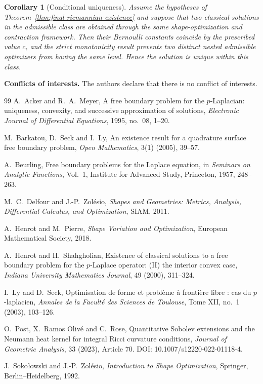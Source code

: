 \documentclass[11pt,a4paper]{article}
\newtheorem{corollary}[theorem]{Corollary}
\theoremstyle{definition}
\theoremstyle{remark}
\begin{document}
\begin{corollary}[Conditional uniqueness]
\label{cor:conditional-uniqueness-riemannian}
Assume the hypotheses of Theorem~\ref{thm:final-riemannian-existence} and
suppose that two classical solutions in the admissible class are obtained
through the same shape-optimization and contraction framework. Then their
Bernoulli constants coincide by the prescribed value $c$, and the strict
monotonicity result prevents two distinct nested admissible optimizers from
having the same level. Hence the solution is unique within this class.
\end{corollary}
\textbf{Conflicts of interests.} The authors declare that there is no conflict of interests.
\begin{thebibliography}{99}
A.~Acker and R.~A.~Meyer,
\newblock A free boundary problem for the $p$-Laplacian:
uniqueness, convexity, and successive approximation of solutions,
\newblock \emph{Electronic Journal of Differential Equations},
1995, no.~08, 1--20.

M.~Barkatou, D.~Seck and I.~Ly,
\newblock An existence result for a quadrature surface free boundary
problem,
\newblock \emph{Open Mathematics}, 3(1) (2005), 39--57.

A.~Beurling,
\newblock Free boundary problems for the Laplace equation,
\newblock in \emph{Seminars on Analytic Functions}, Vol.~1,
Institute for Advanced Study, Princeton, 1957, 248--263.


M.~C.~Delfour and J.-P.~Zol\'esio,
\newblock \emph{Shapes and Geometries: Metrics, Analysis,
Differential Calculus, and Optimization},
\newblock SIAM, 2011.

A.~Henrot and M.~Pierre,
\newblock \emph{Shape Variation and Optimization},
\newblock European Mathematical Society, 2018.


A.~Henrot and H.~Shahgholian,
\newblock Existence of classical solutions to a free boundary problem
for the $p$-Laplace operator: (II) the interior convex case,
\newblock \emph{Indiana University Mathematics Journal}, 49 (2000),
311--324.


I.~Ly and D.~Seck,
\newblock Optimisation de forme et probl\`eme \`a fronti\`ere libre :
cas du $p$-laplacien,
\newblock \emph{Annales de la Facult\'e des Sciences de Toulouse},
Tome XII, no.~1 (2003), 103--126.


O.~Post, X.~Ramos Oliv\'e and C.~Rose,
\newblock Quantitative Sobolev extensions and the Neumann heat kernel
for integral Ricci curvature conditions,
\newblock \emph{Journal of Geometric Analysis}, 33 (2023), Article 70.
\newblock DOI: 10.1007/s12220-022-01118-4.

J.~Soko{\l}owski and J.-P.~Zol\'esio,
\newblock \emph{Introduction to Shape Optimization},
\newblock Springer, Berlin--Heidelberg, 1992.

\end{thebibliography}
\end{document}
